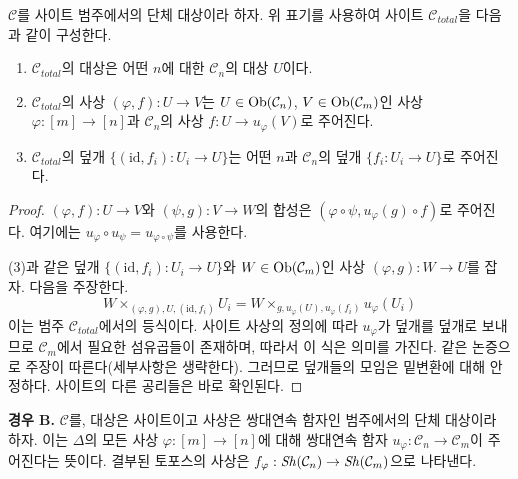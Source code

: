 \begin{lemma}
\label{lemma-simplicial-site-site}
$\mathcal{C}$를 사이트 범주에서의 단체 대상이라 하자.
위 표기를 사용하여 사이트 $\mathcal{C}_{total}$을 다음과 같이 구성한다.
\begin{enumerate}
\item $\mathcal{C}_{total}$의 대상은 어떤 $n$에 대한
$\mathcal{C}_n$의 대상 $U$이다.
\item $\mathcal{C}_{total}$의 사상
$(\varphi, f) : U \to V$는 $U \in \mathop{\mathrm{Ob}}\nolimits(\mathcal{C}_n)$,
$V \in \mathop{\mathrm{Ob}}\nolimits(\mathcal{C}_m)$인 사상 $\varphi : [m] \to [n]$과
$\mathcal{C}_n$의 사상 $f : U \to u_\varphi(V)$로 주어진다.
\item $\mathcal{C}_{total}$의 덮개
$\{(\text{id}, f_i) :  U_i \to U\}$는 어떤 $n$과
$\mathcal{C}_n$의 덮개 $\{f_i : U_i \to U\}$로 주어진다.
\end{enumerate}
\end{lemma}

\begin{proof}
$(\varphi, f) : U \to V$와 $(\psi, g) : V \to W$의 합성은
$(\varphi \circ \psi, u_\varphi(g) \circ f)$로 주어진다.
여기에는 $u_\varphi \circ u_\psi = u_{\varphi \circ \psi}$를 사용한다.

\medskip\noindent
(3)과 같은 덮개 $\{(\text{id}, f_i) :  U_i \to U\}$와
$W \in \mathop{\mathrm{Ob}}\nolimits(\mathcal{C}_m)$인 사상 $(\varphi, g) : W \to U$를 잡자.
다음을 주장한다.
$$
W \times_{(\varphi, g), U, (\text{id}, f_i)} U_i =
W \times_{g, u_\varphi(U), u_\varphi(f_i)} u_\varphi(U_i)
$$
이는 범주 $\mathcal{C}_{total}$에서의 등식이다.
사이트 사상의 정의에 따라 $u_\varphi$가 덮개를 덮개로 보내므로
$\mathcal{C}_m$에서 필요한 섬유곱들이 존재하며, 따라서 이 식은
의미를 가진다. 같은 논증으로 주장이 따른다(세부사항은 생략한다).
그러므로 덮개들의 모임은 밑변환에 대해 안정하다.
사이트의 다른 공리들은 바로 확인된다.
\end{proof}

\noindent
{\bf 경우 B.}
$\mathcal{C}$를, 대상은 사이트이고 사상은 쌍대연속 함자인 범주에서의
단체 대상이라 하자. 이는 $\Delta$의 모든 사상
$\varphi : [m] \to [n]$에 대해 쌍대연속 함자
$u_\varphi : \mathcal{C}_n \to \mathcal{C}_m$이 주어진다는 뜻이다.
결부된 토포스의 사상은
$f_\varphi : \mathop{\mathit{Sh}}\nolimits(\mathcal{C}_n) \to \mathop{\mathit{Sh}}\nolimits(\mathcal{C}_m)$으로 나타낸다.

